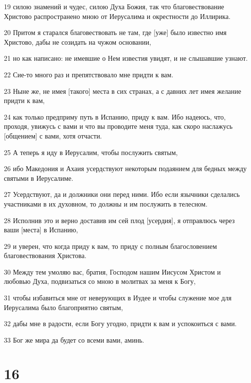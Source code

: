 \par 19 силою знамений и чудес, силою Духа Божия, так что благовествование Христово распространено мною от Иерусалима и окрестности до Иллирика.
\par 20 Притом я старался благовествовать не там, где [уже] было известно имя Христово, дабы не созидать на чужом основании,
\par 21 но как написано: не имевшие о Нем известия увидят, и не слышавшие узнают.
\par 22 Сие-то много раз и препятствовало мне придти к вам.
\par 23 Ныне же, не имея [такого] места в сих странах, а с давних лет имея желание придти к вам,
\par 24 как только предприму путь в Испанию, приду к вам. Ибо надеюсь, что, проходя, увижусь с вами и что вы проводите меня туда, как скоро наслажусь [общением] с вами, хотя отчасти.
\par 25 А теперь я иду в Иерусалим, чтобы послужить святым,
\par 26 ибо Македония и Ахаия усердствуют некоторым подаянием для бедных между святыми в Иерусалиме.
\par 27 Усердствуют, да и должники они перед ними. Ибо если язычники сделались участниками в их духовном, то должны и им послужить в телесном.
\par 28 Исполнив это и верно доставив им сей плод [усердия], я отправлюсь через ваши [места] в Испанию,
\par 29 и уверен, что когда приду к вам, то приду с полным благословением благовествования Христова.
\par 30 Между тем умоляю вас, братия, Господом нашим Иисусом Христом и любовью Духа, подвизаться со мною в молитвах за меня к Богу,
\par 31 чтобы избавиться мне от неверующих в Иудее и чтобы служение мое для Иерусалима было благоприятно святым,
\par 32 дабы мне в радости, если Богу угодно, придти к вам и успокоиться с вами.
\par 33 Бог же мира да будет со всеми вами, аминь.

\chapter{16}

